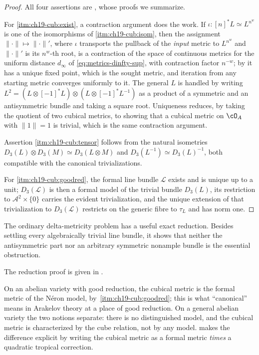 \begin{proof}
All four assertions are \cite[Lemmas~19.1.4, 19.1.6 and
Proposition~19.1.8]{CLD25}, whose proofs we summarize.

For \cref{itm:ch19-cub:exist}, a contraction argument does the work.  If
$\iota:[n]^*L\simeq L^{n^w}$ is one of the isomorphisms of
\cref{itm:ch19-cub:isom}, then the assignment
$\|\cdot\|\mapsto\|\cdot\|'$, where $\iota$ transports the pullback of the
\emph{input} metric to $L^{n^w}$ and $\|\cdot\|'$ is its $n^w$-th root,
is a contraction of the space of continuous metrics for
the uniform distance $d_\infty$ of \eqref{eq:metrics-dinfty-sup}, with
contraction factor $n^{-w}$; by
 it has a unique fixed point, which is the
sought metric, and iteration from any starting metric converges uniformly to
it.  The general $L$ is handled by writing
$L^2=(L\otimes[-1]^*L)\otimes(L\otimes[-1]^*L^{-1})$ as a product of a
symmetric and an antisymmetric bundle and taking a square root.  Uniqueness
reduces, by taking the quotient of two cubical metrics, to showing that a
cubical metric on $\cO_A$ with $\|1\|=1$ is trivial, which is the same
contraction argument.

Assertion \cref{itm:ch19-cub:tensor} follows from the natural isometries
$D_3(L)\otimes D_3(M)\simeq D_3(L\otimes M)$ and
$D_3(L^{-1})\simeq D_3(L)^{-1}$, both compatible with the canonical
trivializations.

For \cref{itm:ch19-cub:goodred}, the formal line bundle $\mathcal L$ exists
and is unique up to a unit; $D_3(\mathcal L)$ is then a formal model of the
trivial bundle $D_3(L)$, its restriction to $\mathcal A^2\times\{0\}$ carries
the evident trivialization, and the unique extension of that trivialization
to $D_3(\mathcal L)$ restricts on the generic fibre to $\tau_L$ and has norm
one.
\end{proof}

The ordinary delta-metricity problem has a useful exact reduction.  Besides
settling every algebraically trivial line bundle, it shows that neither the
antisymmetric part nor an arbitrary symmetric nonample bundle is the
essential obstruction.



The reduction proof is given in .

\begin{remark}
\label{rem:ch19-canonical-two-meanings}
On an abelian variety with good reduction, the cubical metric is the formal
metric of the N\'eron model, by
\,\cref{itm:ch19-cub:goodred}; this is what
``canonical'' means in Arakelov theory at a place of good reduction.  On a
general abelian variety the two notions separate: there is no distinguished
model, and the cubical metric is characterized by the cube relation, not by
any model.   makes the difference
explicit by writing the cubical metric as a formal metric \emph{times} a
quadratic tropical correction.
\end{remark}

